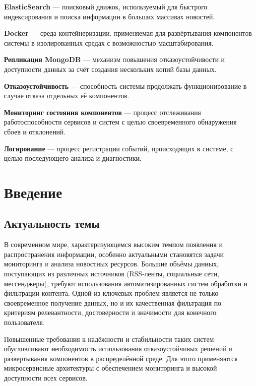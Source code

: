 \textbf{ElasticSearch} --- поисковый движок, используемый для быстрого
индексирования и поиска информации в больших массивах новостей.

\textbf{Docker} --- среда контейнеризации, применяемая для развёртывания
компонентов системы в изолированных средах с возможностью
масштабирования.

\textbf{Репликация MongoDB} --- механизм повышения отказоустойчивости и
доступности данных за счёт создания нескольких копий базы данных.

\textbf{Отказоустойчивость} --- способность системы продолжать
функционирование в случае отказа отдельных её компонентов.

\textbf{Мониторинг состояния компонентов} --- процесс отслеживания
работоспособности сервисов и систем с целью своевременного обнаружения
сбоев и отклонений.

\textbf{Логирование} --- процесс регистрации событий, происходящих в
системе, с целью последующего анализа и диагностики.

\hypertarget{ux432ux432ux435ux434ux435ux43dux438ux435}{%
\section{Введение}\label{ux432ux432ux435ux434ux435ux43dux438ux435}}

\hypertarget{ux430ux43aux442ux443ux430ux43bux44cux43dux43eux441ux442ux44c-ux442ux435ux43cux44b}{%
\subsection{Актуальность
темы}\label{ux430ux43aux442ux443ux430ux43bux44cux43dux43eux441ux442ux44c-ux442ux435ux43cux44b}}

В современном мире, характеризующемся высоким темпом появления и
распространения информации, особенно актуальными становятся задачи
мониторинга и анализа новостных ресурсов. Большие объёмы данных,
поступающих из различных источников (RSS-ленты, социальные сети,
мессенджеры), требуют использования автоматизированных систем обработки
и фильтрации контента. Одной из ключевых проблем является не только
своевременное получение данных, но и их качественная фильтрация по
критериям релевантности, достоверности и значимости для конечного
пользователя.

Повышенные требования к надёжности и стабильности таких систем
обусловливают необходимость использования отказоустойчивых решений и
развертывания компонентов в распределённой среде. Для этого применяются
микросервисные архитектуры с обеспечением мониторинга и высокой
доступности всех сервисов.

